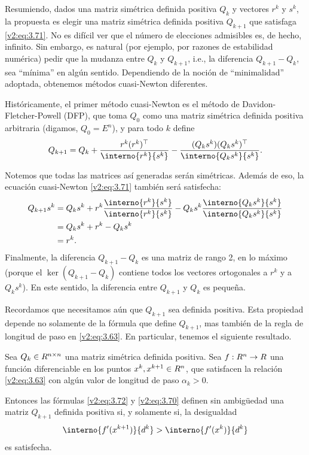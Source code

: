 Resumiendo, dados una matriz simétrica definida positiva $Q_k$ y vectores $r^k$ y $s^k$, la propuesta es elegir una matriz simétrica definida positiva $Q_{k+1}$ que satisfaga \eqref{v2:eq:3.71}. No es difícil ver que el número de elecciones admisibles es, de hecho, infinito. Sin embargo, es natural (por ejemplo, por razones de estabilidad numérica) pedir que la mudanza entre $Q_k$ y $Q_{k+1}$, i.e., la diferencia $Q_{k+1} - Q_k$, sea ``mínima'' en algún sentido. Dependiendo de la noción de ``minimalidad'' adoptada, obtenemos métodos cuasi-Newton diferentes.

Históricamente, el primer método cuasi-Newton es el método de Davidon-Fletcher-Powell (DFP), que toma $Q_0$ como una matriz simétrica definida positiva arbitraria (digamos, $Q_0 = E^n$), y para todo $k$ define
\begin{equation}
    Q_{k+1} = Q_k + \frac{r^k (r^k)^\top}{\interno{r^k}{s^k}} - \frac{(Q_k s^k)(Q_k s^k)^\top}{\interno{Q_k s^k}{s^k}}.
    \label{v2:eq:3.72}
\end{equation}

Notemos que todas las matrices así generadas serán simétricas. Además de eso, la ecuación cuasi-Newton \eqref{v2:eq:3.71} también será satisfecha:
\begin{align*}
    Q_{k+1} s^k &= Q_k s^k + r^k \frac{\interno{r^k}{s^k}}{\interno{r^k}{s^k}} - Q_k s^k \frac{\interno{Q_k s^k}{s^k}}{\interno{Q_k s^k}{s^k}} \\
    &= Q_k s^k + r^k - Q_k s^k \\
    &= r^k.
\end{align*}
Finalmente, la diferencia $Q_{k+1} - Q_k$ es una matriz de rango 2, en lo máximo (porque el $\ker(Q_{k+1} - Q_k)$ contiene todos los vectores ortogonales a $r^k$ y a $Q_k s^k$). En este sentido, la diferencia entre $Q_{k+1}$ y $Q_k$ es pequeña.

Recordamos que necesitamos aún que $Q_{k+1}$ sea definida positiva. Esta propiedad depende no solamente de la fórmula que define $Q_{k+1}$, mas también de la regla de longitud de paso en \eqref{v2:eq:3.63}. En particular, tenemos el siguiente resultado.

\begin{proposition}\label{v2:prop:3.2.1}
    Sea $Q_k \in R^{n \times n}$ una matriz simétrica definida positiva. Sea $f : R^n \to R$ una función diferenciable en los puntos $x^k, x^{k+1} \in R^n$, que satisfacen la relación \eqref{v2:eq:3.63} con algún valor de longitud de paso $\alpha_k > 0$.
    
    Entonces las fórmulas \eqref{v2:eq:3.72} y \eqref{v2:eq:3.70} definen sin ambigüedad una matriz $Q_{k+1}$ definida positiva si, y solamente si, la desigualdad
    \begin{equation}
        \interno{f'(x^{k+1})}{d^k} > \interno{f'(x^k)}{d^k}
        \label{v2:eq:3.73}
    \end{equation}
    es satisfecha.
\end{proposition}

